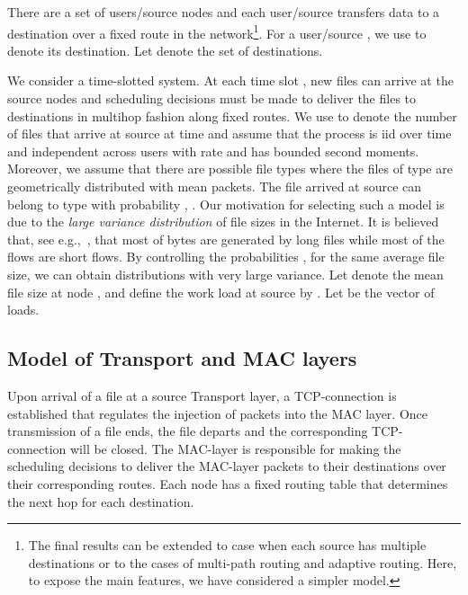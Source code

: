 \documentclass[10pt,onecolumn,draftclsnofoot,journal]{IEEEtran}
\begin{document}
There are a set of users/source nodes  and each user/source transfers data to a destination over a fixed route in the network\footnote{The final results can be extended to case when each source has multiple destinations or to the cases of multi-path routing and adaptive routing. Here, to expose the main features, we have considered a simpler model.}. For a user/source , we use  to denote its destination. Let  denote the set of destinations.

We consider a time-slotted system. At each time slot ,
new files can arrive at the source nodes and scheduling decisions must be made to deliver the files to destinations in multihop fashion along fixed routes.
We use  to denote the number of files that arrive at source  at time  and assume that the process  is iid over time and independent across users with rate  and has bounded second moments.
Moreover, we assume that there are  possible file types where the files of type  are geometrically distributed with mean  packets. The file arrived at source  can belong to type  with probability , . Our motivation for selecting such a model is due to the \textit{large variance distribution} of file sizes in the Internet. It is believed that, see e.g.,~\cite{self}, that most of bytes are generated by long files while most of the flows are short flows. By controlling the probabilities , for the same average file size, we can obtain distributions with very large variance.
Let  denote the mean file size at node , and define the work load at source  by . Let  be the vector of loads.
\subsection*{Model of Transport and MAC layers}
Upon arrival of a file at a source Transport layer, a TCP-connection is
established that regulates the injection of packets into the
MAC layer. Once transmission of
a file ends, the file departs and the corresponding TCP-connection
will be closed. The MAC-layer is responsible for making the scheduling decisions to deliver the MAC-layer packets to their destinations over their corresponding routes. Each node has a fixed routing table that determines the next hop for each destination.
\end{document}
